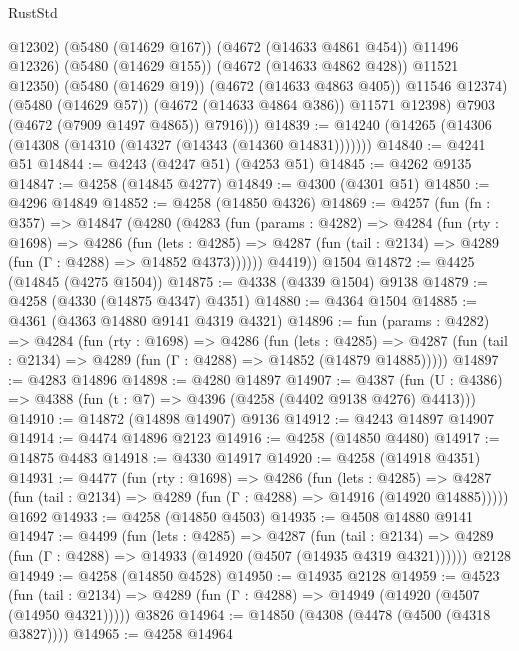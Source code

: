 \begin{lexlean}{RustStd}
\begin{coremodule}
                    @12302)
                  (@5480 (@14629 @167))
                  (@4672 (@14633 @4861 @454))
                  @11496
                  @12326)
                (@5480 (@14629 @155))
                (@4672 (@14633 @4862 @428))
                @11521
                @12350)
              (@5480 (@14629 @19))
              (@4672 (@14633 @4863 @405))
              @11546
              @12374)
            (@5480 (@14629 @57))
            (@4672 (@14633 @4864 @386))
            @11571
            @12398)
          @7903
          (@4672 (@7909 @1497 @4865))
          @7916)))
@14839 := @14240 (@14265 (@14306 (@14308 (@14310 (@14327 (@14343 (@14360 @14831)))))))
@14840 := @4241 @51
@14844 := @4243 (@4247 @51) (@4253 @51)
@14845 := @4262 @9135
@14847 := @4258 (@14845 @4277)
@14849 := @4300 (@4301 @51)
@14850 := @4296 @14849
@14852 := @4258 (@14850 @4326)
@14869 := @4257
    (fun (fn : @357) =>
    @14847
      (@4280
        (@4283
          (fun (params : @4282) =>
          @4284
            (fun (rty : @1698) =>
            @4286
              (fun (lets : @4285) =>
              @4287 (fun (tail : @2134) => @4289 (fun (Γ : @4288) => @14852 @4373))))))
        @4419))
    @1504
@14872 := @4425 (@14845 (@4275 @1504))
@14875 := @4338 (@4339 @1504) @9138
@14879 := @4258 (@4330 (@14875 @4347) @4351)
@14880 := @4364 @1504
@14885 := @4361 (@4363 @14880 @9141 @4319 @4321)
@14896 := fun (params : @4282) =>
  @4284
    (fun (rty : @1698) =>
    @4286
      (fun (lets : @4285) =>
      @4287 (fun (tail : @2134) => @4289 (fun (Γ : @4288) => @14852 (@14879 @14885)))))
@14897 := @4283 @14896
@14898 := @4280 @14897
@14907 := @4387 (fun (U : @4386) => @4388 (fun (t : @7) => @4396 (@4258 (@4402 @9138 @4276) @4413)))
@14910 := @14872 (@14898 @14907) @9136
@14912 := @4243 @14897 @14907
@14914 := @4474 @14896 @2123
@14916 := @4258 (@14850 @4480)
@14917 := @14875 @4483
@14918 := @4330 @14917
@14920 := @4258 (@14918 @4351)
@14931 := @4477
    (fun (rty : @1698) =>
    @4286
      (fun (lets : @4285) =>
      @4287 (fun (tail : @2134) => @4289 (fun (Γ : @4288) => @14916 (@14920 @14885)))))
    @1692
@14933 := @4258 (@14850 @4503)
@14935 := @4508 @14880 @9141
@14947 := @4499
    (fun (lets : @4285) =>
    @4287
      (fun (tail : @2134) =>
      @4289 (fun (Γ : @4288) => @14933 (@14920 (@4507 (@14935 @4319 @4321))))))
    @2128
@14949 := @4258 (@14850 @4528)
@14950 := @14935 @2128
@14959 := @4523
    (fun (tail : @2134) => @4289 (fun (Γ : @4288) => @14949 (@14920 (@4507 (@14950 @4321)))))
    @3826
@14964 := @14850 (@4308 (@4478 (@4500 (@4318 @3827))))
@14965 := @4258 @14964

\end{coremodule}
\end{lexlean}
